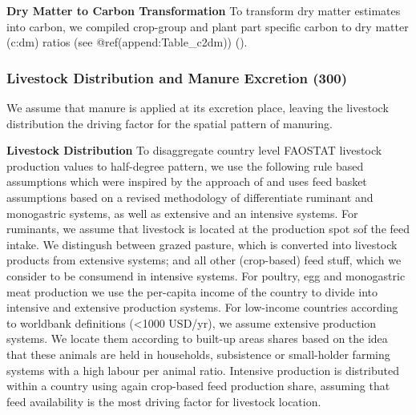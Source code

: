 \documentclass[gc, manuscript]{copernicus}
\begin{document}
\textbf{Dry Matter to Carbon Transformation}
To transform dry matter estimates into carbon, we compiled crop-group and plant part specific carbon to dry matter (c:dm) ratios (see @ref(append:Table\_c2dm)) (\citet{Ma2018}).

\hypertarget{sec:livst_manure}{%
\subsubsection{Livestock Distribution and Manure Excretion (300)}\label{sec:livst_manure}}

We assume that manure is applied at its excretion place, leaving the livestock distribution the driving factor for the spatial pattern of manuring.

\textbf{Livestock Distribution}
To disaggregate country level FAOSTAT livestock production values to half-degree pattern, we use the following rule based assumptions which were inspired by the approach of \citep{gilbert} and uses feed basket assumptions based on a revised methodology of \citet{weindl.We} differentiate ruminant and monogastric systems, as well as extensive and an intensive systems.
For ruminants, we assume that livestock is located at the production spot sof the feed intake. We distingush between grazed pasture, which is converted into livestock products from extensive systems; and all other (crop-based) feed stuff, which we consider to be consumend in intensive systems.
For poultry, egg and monogastric meat production we use the per-capita income of the country to divide into intensive and extensive production systems. For low-income countries according to worldbank definitions (\textless1000 USD/yr), we assume extensive production systems. We locate them according to built-up areas shares based on the idea that these animals are held in households, subsistence or small-holder farming systems with a high labour per animal ratio. Intensive production is distributed within a country using again crop-based feed production share, assuming that feed availability is the most driving factor for livestock location.
\end{document}
